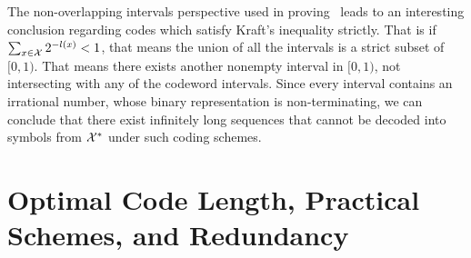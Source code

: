     \begin{remark}
        The non-overlapping intervals perspective used in proving~ leads to an interesting conclusion regarding codes which satisfy Kraft's inequality strictly. That is if $\sum_{x \in \mathcal{X}}2^{-l(x)} < 1$, that means the union of all the intervals is a strict subset of $[0,1)$. That means there exists another nonempty interval in $[0,1)$, not intersecting with any of the codeword intervals. Since every interval contains an irrational number, whose binary representation is non-terminating, we can conclude that there exist infinitely long sequences that cannot be decoded into symbols from $\mathcal{X}^*$ under such coding schemes.  
    \end{remark}
    
\section{Optimal Code Length, Practical Schemes, and Redundancy}
    \label{sec:coding-schemes}

